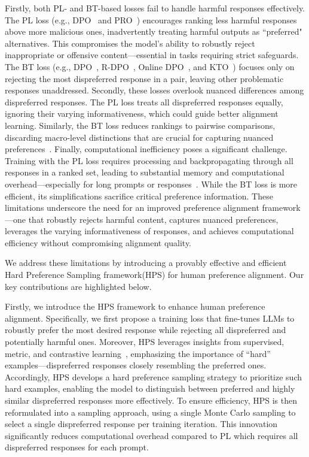 Firstly, both PL- and BT-based losses fail to handle harmful responses effectively. The PL loss (e.g., DPO~\cite{dpo} and PRO~\cite{pro}) encourages ranking less harmful responses above more malicious ones, inadvertently treating harmful outputs as ``preferred" alternatives. This compromises the model's ability to robustly reject inappropriate or offensive content—essential in tasks requiring strict safeguards. The BT loss (e.g., DPO~\cite{dpo}, R-DPO~\cite{rdpo}, Online DPO~\cite{onlinerlhf}, and KTO~\cite{kto}) focuses only on rejecting the most dispreferred response in a pair, leaving other problematic responses unaddressed. 
Secondly, these losses overlook nuanced differences among dispreferred responses. The PL loss treats all dispreferred responses equally, ignoring their varying informativeness, which could guide better alignment learning. Similarly, the BT loss reduces rankings to pairwise comparisons, discarding macro-level distinctions that are crucial for capturing nuanced preferences~\cite{sun2024rethinking, pro}.  Finally, computational inefficiency poses a significant challenge. Training with the PL loss requires processing and backpropagating through all responses in a ranked set, leading to substantial memory and computational overhead—especially for long prompts or responses~\cite{oosterhuis2021computationally, maystre2015fast, sakhi2023fast}. While the BT loss is more efficient, its simplifications sacrifice critical preference information. These limitations underscore the need for an improved preference alignment framework—one that robustly rejects harmful content, captures nuanced preferences, leverages the varying informativeness of responses, and achieves computational efficiency without compromising alignment quality.


 We address these limitations by introducing a provably effective and efficient   Hard Preference Sampling framework(HPS)  for human preference alignment.  Our key contributions are highlighted below. 

 
Firstly, we introduce the HPS framework to enhance human preference alignment. Specifically, we first propose a training loss that fine-tunes LLMs to robustly prefer the most desired response while rejecting all dispreferred and potentially harmful ones. Moreover, HPS leverages insights from supervised, metric, and contrastive learning~\cite{schroff2015facenet, oh2016deep, contrastivehard}, emphasizing the importance of ``hard” examples—dispreferred responses closely resembling the preferred ones. Accordingly, HPS develops a hard preference sampling strategy to prioritize such hard examples, enabling the model to distinguish between preferred and highly similar dispreferred responses more effectively. To ensure efficiency, HPS is then reformulated into a sampling  approach, using a single Monte Carlo sampling to select a single dispreferred response per training iteration. This innovation significantly reduces computational overhead compared to PL which requires all dispreferred responses for each prompt.
 

